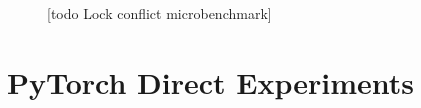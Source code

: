 \begin{figure}[h!]
    \centering
    
    \caption{[todo Lock conflict microbenchmark]}
    \label{Eval: Lock conflict microbenchmark}
\end{figure}    






\section{PyTorch Direct Experiments}
